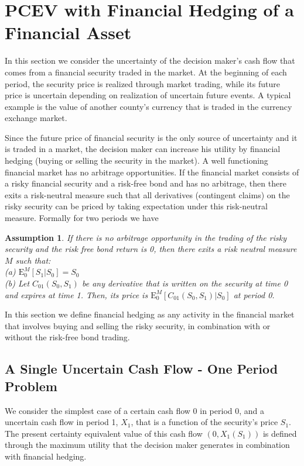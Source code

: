 \documentclass{article}[12pt letter]
\newtheorem{assumption}[theorem]{Assumption}
\newcommand{\E}{\mathrm{E}}
\begin{document}
\section{PCEV with Financial Hedging of a Financial Asset}

In this section we consider the uncertainty of the decision maker's cash flow  that comes from a financial security traded in the market. At the beginning of each period, the security price is realized through market trading, while its future price is uncertain depending on realization of uncertain future events. A typical example is the value of another county's currency that is traded in the currency exchange market. 

Since the future price of financial security is the only source of uncertainty and it is traded in a market, the decision maker can increase his utility by financial hedging (buying or selling the security in the market). A well functioning financial market has no arbitrage opportunities. If the financial market consists of a risky financial security and a risk-free bond and has no arbitrage, then there exits a risk-neutral measure such that all derivatives (contingent claims) on the risky security can be priced by taking expectation under this risk-neutral measure. Formally for two periods we have    
\begin{assumption}
If there is no arbitrage opportunity in the trading of the risky security and the risk free bond return is 0, then there exits a risk neutral measure $M$ such that:\\
(a) $\E_0^M [S_1|S_0] = S_0 $ \\
(b) Let $C_{01}(S_0,S_1)$ be any derivative that is written on the security at time 0 and expires at time 1.  Then, its price is $\E_0^M[C_{01}(S_0,S_1)|S_0]$ at period 0.
\end{assumption}

In this section we define financial hedging as any activity in the financial market that involves buying and selling the risky security, in combination with or without the risk-free bond trading.


\subsection{A Single Uncertain Cash Flow - One Period Problem}
We consider the simplest case of a certain cash flow 0 in period 0, and a uncertain cash flow in period 1, $X_1$, that is a function of the security's price $S_1$. The present certainty equivalent value of this cash flow $(0, X_1(S_1))$ is defined through the maximum utility that the decision maker generates in combination with financial hedging.
\end{document}
